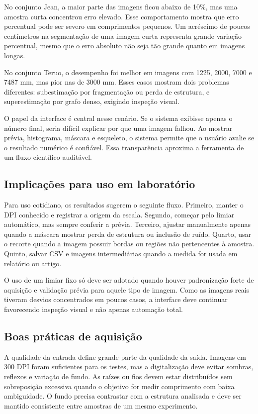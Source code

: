 \documentclass[12pt]{article}
\begin{document}
No conjunto Jean, a maior parte das imagens ficou abaixo de 10\%, mas uma amostra curta concentrou erro elevado. Esse comportamento mostra que erro percentual pode ser severo em comprimentos pequenos. Um acréscimo de poucos centímetros na segmentação de uma imagem curta representa grande variação percentual, mesmo que o erro absoluto não seja tão grande quanto em imagens longas.

No conjunto Teruo, o desempenho foi melhor em imagens com 1225, 2000, 7000 e 7487 mm, mas pior nas de 3000 mm. Esses casos mostram dois problemas diferentes: subestimação por fragmentação ou perda de estrutura, e superestimação por grafo denso, exigindo inspeção visual.

O papel da interface é central nesse cenário. Se o sistema exibisse apenas o número final, seria difícil explicar por que uma imagem falhou. Ao mostrar prévia, histograma, máscara e esqueleto, o sistema permite que o usuário avalie se o resultado numérico é confiável. Essa transparência aproxima a ferramenta de um fluxo científico auditável.

\subsection{Implicações para uso em laboratório}

Para uso cotidiano, os resultados sugerem o seguinte fluxo. Primeiro, manter o DPI conhecido e registrar a origem da escala. Segundo, começar pelo limiar automático, mas sempre conferir a prévia. Terceiro, ajustar manualmente apenas quando a máscara mostrar perda de estrutura ou inclusão de ruído. Quarto, usar o recorte quando a imagem possuir bordas ou regiões não pertencentes à amostra. Quinto, salvar CSV e imagens intermediárias quando a medida for usada em relatório ou artigo.

O uso de um limiar fixo só deve ser adotado quando houver padronização forte de aquisição e validação prévia para aquele tipo de imagem. Como as imagens reais tiveram desvios concentrados em poucos casos, a interface deve continuar favorecendo inspeção visual e não apenas automação total.

\subsection{Boas práticas de aquisição}

A qualidade da entrada define grande parte da qualidade da saída. Imagens em 300 DPI foram suficientes para os testes, mas a digitalização deve evitar sombras, reflexos e variação de fundo. As raízes ou fios devem estar distribuídos sem sobreposição excessiva quando o objetivo for medir comprimento com baixa ambiguidade. O fundo precisa contrastar com a estrutura analisada e deve ser mantido consistente entre amostras de um mesmo experimento.
\end{document}
